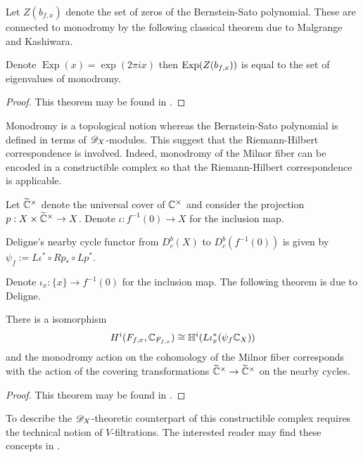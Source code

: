 Let $Z(b_{f,x})$ denote the set of zeros of the Bernstein-Sato polynomial.
These are connected to monodromy by the following classical theorem due to Malgrange and Kashiwara.
\begin{theorem}\label{thm: EigMonodromy}
Denote $\operatorname{Exp}(x) = \exp(2\pi ix)$ then $\operatorname{Exp}(Z(b_{f,x}))$ is equal to the set of eigenvalues of monodromy.
\end{theorem}
\begin{proof}
  This theorem may be found in \cite{budur2015bernstein}.
\end{proof}
Monodromy is a topological notion whereas the Bernstein-Sato polynomial is defined in terms of $\mathscr{D}_X$-modules.
This suggest that the Riemann-Hilbert correspondence is involved.
Indeed, monodromy of the Milnor fiber can be encoded in a constructible complex so that the Riemann-Hilbert correspondence is applicable.

Let $\widetilde{\mathbb{C}}^\times$ denote the universal cover of $\mathbb{C}^\times$ and consider the projection $p:X\times \widetilde{\mathbb{C}}^\times \to X$.
Denote $\iota:f^{-1}(0)\to X$ for the inclusion map.
\begin{definition}
  Deligne's nearby cycle functor from $D^b_c(X)$ to $D_c^b(f^{-1}(0))$ is given by $\psi_f:= L\iota^* \circ Rp_*\circ Lp^*$.
\end{definition}
Denote $\iota_x:\{x\}\to f^{-1}(0)$ for the inclusion map.
The following theorem is due to Deligne.
\begin{theorem}
  There is a isomorphism
  $$H^i(F_{f,x}, \mathbb{C}_{F_{f,x}}) \cong \mathbb{H}^i(L\iota_x^* (\psi_f \mathbb{C}_X)) $$
  and the monodromy action on the cohomology of the Milnor fiber corresponds with the action of the covering transformations $\widetilde{\mathbb{C}}^\times \to \widetilde{\mathbb{C}}^\times$ on the nearby cycles.
\end{theorem}
\begin{proof}
  This theorem may be found in \cite{budur2015bernstein}.
\end{proof}
To describe the $\mathscr{D}_X$-theoretic counterpart of this constructible complex requires the technical notion of $V$-filtrations.
The interested reader may find these concepts in \cite{budur2015bernstein}.
